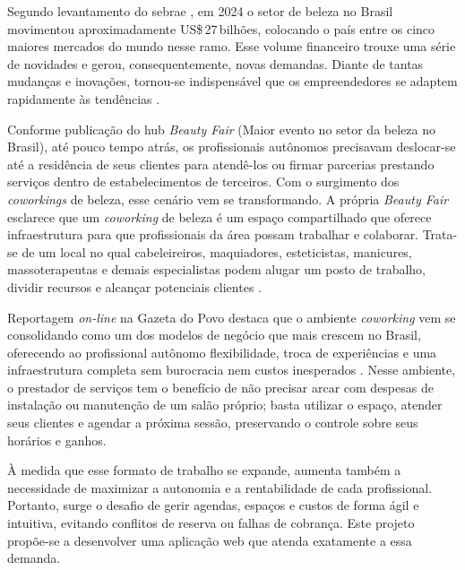 
Segundo levantamento do \gls{sebrae} 
, em 2024 o setor de beleza no Brasil movimentou aproximadamente US\$\,27\,bilhões, colocando o país entre os cinco maiores mercados do mundo nesse ramo. Esse volume financeiro trouxe uma série de novidades e gerou, consequentemente, novas demandas. Diante de tantas mudanças e inovações, tornou-se indispensável que os empreendedores se adaptem rapidamente às tendências \cite{Sebrae_2024}.

Conforme publicação do hub \emph{Beauty Fair} (Maior evento no setor da beleza no Brasil), até pouco tempo atrás, os profissionais autônomos precisavam deslocar-se até a residência de seus clientes para atendê-los ou firmar parcerias prestando serviços dentro de estabelecimentos de terceiros. Com o surgimento dos \emph{coworkings} de beleza, esse cenário vem se transformando. A própria \emph{Beauty Fair} esclarece que um \emph{coworking} de beleza é um espaço compartilhado que oferece infraestrutura para que profissionais da área possam trabalhar e colaborar. Trata-se de um local no qual cabeleireiros, maquiadores, esteticistas, manicures, massoterapeutas e demais especialistas podem alugar um posto de trabalho, dividir recursos e alcançar potenciais clientes \cite{BeautyFair}.

Reportagem \emph{on-line} na Gazeta do Povo destaca que o ambiente \emph{coworking} vem se consolidando como um dos modelos de negócio que mais crescem no Brasil, oferecendo ao profissional autônomo flexibilidade, troca de experiências e uma infraestrutura completa sem burocracia nem custos inesperados \cite{gazeta-coworking}. Nesse ambiente, o prestador de serviços tem o benefício de não precisar arcar com despesas de instalação ou manutenção de um salão próprio; basta utilizar o espaço, atender seus clientes e agendar a próxima sessão, preservando o controle sobre seus horários e ganhos.

À medida que esse formato de trabalho se expande, aumenta também a necessidade de maximizar a autonomia e a rentabilidade de cada profissional. Portanto, surge o desafio de gerir agendas, espaços e custos de forma ágil e intuitiva, evitando conflitos de reserva ou falhas de cobrança. Este projeto propõe-se a desenvolver uma aplicação web que atenda exatamente a essa demanda.





